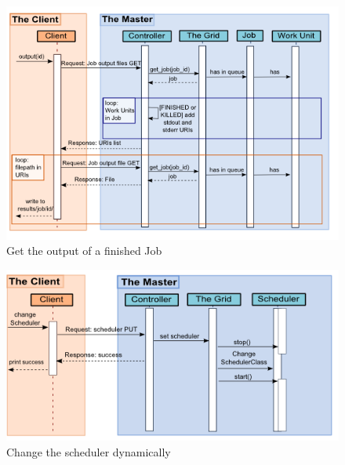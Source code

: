 \begin{figure}[htbp]
\centering
\includegraphics[keepaspectratio,width=\textwidth,height=0.75\textheight]{./figs/getoutput.png}
\caption{Get the output of a finished Job}
\end{figure}


\begin{figure}[htbp]
\centering
\includegraphics[keepaspectratio,width=\textwidth,height=0.75\textheight]{./figs/scheduler.png}
\caption{Change the scheduler dynamically}
\end{figure}


